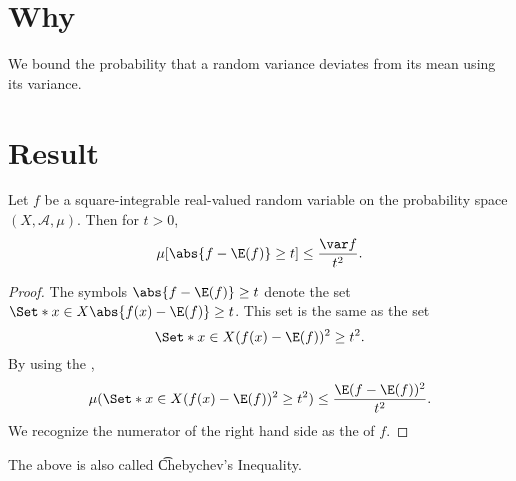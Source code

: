 

\section*{Why}

We bound the probability that a random variance deviates from its mean using its variance.

\section*{Result}

\begin{proposition}
Let $f$ be a square-integrable real-valued random variable on the probability space $(X, \mathcal{A} , \mu )$.
Then for $t > 0$,
\[
\mu [\abs{f - \E (f)} \geq t] \leq \frac{\var f}{t^2}.
\]
\begin{proof}The symbols $\abs{f - \E (f)} \geq t$ denote the set $\Set*{x \in X}{ \abs{f(x) - \E (f)} \geq t}$.
This set is the same as the set
\[
\Set*{x \in X}{({f(x) - \E (f)})^2 \geq t^2}.
\]
By using the ,
\[
\mu (\Set*{x \in X}{({f(x) - \E (f)})^2 \geq t^2}) \leq \frac{\E (f - \E (f))^2}{t^2}.
\]
We recognize the numerator of the right hand side as the of $f$.\end{proof}
\end{proposition}

The above is also called \t{Chebychev's Inequality}.

\blankpage